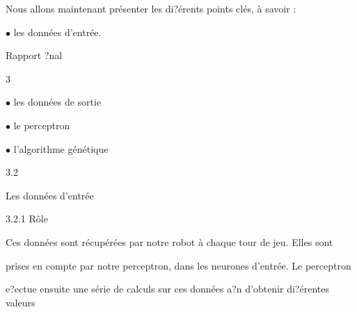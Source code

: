 \documentclass[a4paper,portrait,12pt]{article}
\begin{document}
\begin{flushleft}
Nous allons maintenant pr\'{e}senter les di?\'{e}rents points cl\'{e}s, \`{a} savoir :
\end{flushleft}


\begin{flushleft}
$\bullet$ les donn\'{e}es d'entr\'{e}e.
\end{flushleft}





\begin{flushleft}
\newpage
Rapport ?nal
\end{flushleft}





3





\begin{flushleft}
$\bullet$ les donn\'{e}es de sortie
\end{flushleft}


\begin{flushleft}
$\bullet$ le perceptron
\end{flushleft}


\begin{flushleft}
$\bullet$ l'algorithme g\'{e}n\'{e}tique
\end{flushleft}


3.2





\begin{flushleft}
Les donn\'{e}es d'entr\'{e}e
\end{flushleft}





\begin{flushleft}
3.2.1 R\^{o}le
\end{flushleft}


\begin{flushleft}
Ces donn\'{e}es sont r\'{e}cup\'{e}r\'{e}es par notre robot \`{a} chaque tour de jeu. Elles sont
\end{flushleft}


\begin{flushleft}
prises en compte par notre perceptron, dans les neurones d'entr\'{e}e. Le perceptron
\end{flushleft}


\begin{flushleft}
e?ectue ensuite une s\'{e}rie de calculs sur ces donn\'{e}es a?n d'obtenir di?\'{e}rentes valeurs
\end{flushleft}
\end{document}

